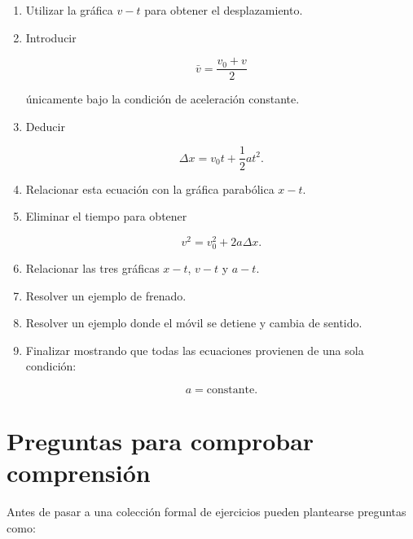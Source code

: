 \begin{notapedagogica}
\begin{enumerate}
    \item Utilizar la gráfica \(v-t\) para obtener el desplazamiento.

    \item Introducir

    \[
    \bar{v}=\frac{v_0+v}{2}
    \]

    únicamente bajo la condición de aceleración constante.

    \item Deducir

    \[
    \Delta x=v_0t+\frac{1}{2}at^2.
    \]

    \item Relacionar esta ecuación con la gráfica parabólica \(x-t\).

    \item Eliminar el tiempo para obtener

    \[
    v^2=v_0^2+2a\Delta x.
    \]

    \item Relacionar las tres gráficas \(x-t\), \(v-t\) y \(a-t\).

    \item Resolver un ejemplo de frenado.

    \item Resolver un ejemplo donde el móvil se detiene y cambia de sentido.

    \item Finalizar mostrando que todas las ecuaciones provienen de una sola
    condición:

    \[
    a=\text{constante}.
    \]

\end{enumerate}
\end{notapedagogica}


\section{Preguntas para comprobar comprensión}

Antes de pasar a una colección formal de ejercicios pueden plantearse
preguntas como:

